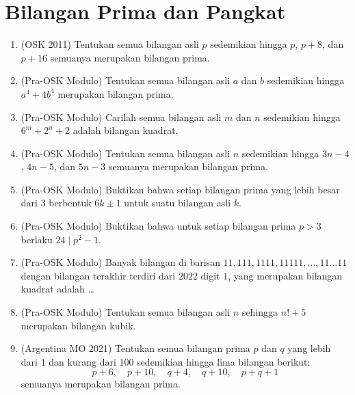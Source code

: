\documentclass[12pt]{scrartcl}
\begin{document}
\section{Bilangan Prima dan Pangkat}
\begin{enumerate}[resume]

	\item (OSK 2011)
	Tentukan semua bilangan asli $p$ sedemikian hingga $p$, $p + 8$, dan $p + 16$
	semuanya merupakan bilangan prima.

	\item (Pra-OSK Modulo)
	Tentukan semua bilangan asli $a$ dan $b$ sedemikian hingga $a^4 + 4b^4$
	merupakan bilangan prima.

	\item (Pra-OSK Modulo)
	Carilah semua bilangan asli $m$ dan $n$ sedemikian hingga $6^m + 2^n + 2$
	adalah bilangan kuadrat.

	\item (Pra-OSK Modulo)
	Tentukan semua bilangan asli $n$ sedemikian hingga $3n - 4$, $4n - 5$,
	dan $5n - 3$ semuanya merupakan bilangan prima.

	\item (Pra-OSK Modulo)
	Buktikan bahwa setiap bilangan prima yang lebih besar dari $3$
	berbentuk $6k \pm 1$ untuk suatu bilangan asli $k$.

	\item (Pra-OSK Modulo)
	Buktikan bahwa untuk setiap bilangan prima $p > 3$ berlaku $24 \mid p^2 - 1$.

	\item (Pra-OSK Modulo)
	Banyak bilangan di barisan $11, 111, 1111, 11111, \ldots, 11\ldots11$
	dengan bilangan terakhir terdiri dari $2022$ digit $1$,
	yang merupakan bilangan kuadrat adalah \dots

	\item (Pra-OSK Modulo)
	Tentukan semua bilangan asli $n$ sehingga $n! + 5$ merupakan bilangan kubik.

	\item (Argentina MO 2021)
	Tentukan semua bilangan prima $p$ dan $q$ yang lebih dari $1$ dan kurang dari $100$
	sedemikian hingga lima bilangan berikut:
	\[ p + 6,\quad p + 10,\quad q + 4,\quad q + 10,\quad p + q + 1 \]
	semuanya merupakan bilangan prima.


\end{enumerate}
\end{document}
